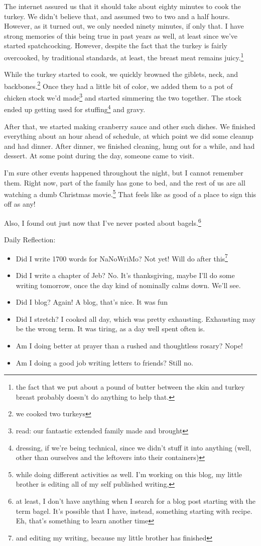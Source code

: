 \documentclass[12pt]{article}[titlepage]
\newcommand{\1}{\={a}}
\newcommand{\2}{\={e}}
\newcommand{\3}{\={\i}}
\newcommand{\4}{\=o}
\newcommand{\5}{\=u}
\newcommand{\6}{\={A}}
\renewcommand{\,}{\textsuperscript{,}}
\begin{document}
The internet assured us that it should take about eighty minutes to cook the turkey.
We didn't believe that, and assumed two to two and a half hours.
However, as it turned out, we only needed ninety minutes, if only that.
I have strong memories of this being true in past years as well, at least since we've started spatchcocking.
However, despite the fact that the turkey is fairly overcooked, by traditional standards, at least, the breast meat remains juicy.\footnote{the fact that we put about a pound of butter between the skin and turkey breast probably doesn't do anything to help that.}

While the turkey started to cook, we quickly browned the giblets, neck, and backbones.\footnote{we cooked two turkeys}
Once they had a little bit of color, we added them to a pot of chicken stock we'd made\footnote{read: our fantastic extended family made and brought} and started simmering the two together.
The stock ended up getting used for stuffing\footnote{dressing, if we're being technical, since we didn't stuff it into anything (well, other than ourselves and the leftovers into their containers)} and gravy.

After that, we started making cranberry sauce and other such dishes.
We finished everything about an hour ahead of schedule, at which point we did some cleanup and had dinner.
After dinner, we finished cleaning, hung out for a while, and had dessert.
At some point during the day, someone came to visit.

I'm sure other events happened throughout the night, but I cannot remember them.
Right now, part of the family has gone to bed, and the rest of us are all watching a dumb Christmas movie.\footnote{while doing different activities as well.
I'm working on this blog, my little brother is editing all of my self published writing,}
That feels like as good of a place to sign this off as any!

Also, I found out just now that I've never posted about bagels.\footnote{at least, I don't have anything when I search for a blog post starting with the term bagel.
It's possible that I have, instead, something starting with recipe.
Eh, that's something to learn another time}

Daily Reflection:
\begin{itemize}
\item Did I write 1700 words for NaNoWriMo? Not yet! Will do after this\footnote{and editing my writing, because my little brother has finished}
\item Did I write a chapter of Jeb? No. It's thanksgiving, maybe I'll do some writing tomorrow, once the day kind of nominally calms down.
We'll see.
\item Did I blog? Again! A blog, that's nice. It was fun
\item Did I stretch? I cooked all day, which was pretty exhausting. Exhausting may be the wrong term. It was tiring, as a day well spent often is.
\item Am I doing better at prayer than a rushed and thoughtless rosary? Nope!
\item Am I doing a good job writing letters to friends? Still no.
\end{itemize}
\end{document}
